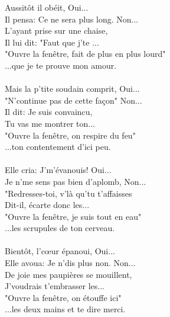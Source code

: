 \breakpage
Aussitôt il obéit, Oui...
\\Il pensa: Ce ne sera plus long. Non...
\\L'ayant prise sur une chaise,
\\Il lui dit: "Faut que j'te ...
\\"Ouvre la fenêtre, fait de plus en plus lourd"
\\...que je te prouve mon amour.
\\\\Mais la p'tite soudain comprit, Oui...
\\"N'continue pas de cette façon" Non...
\\Il dit: Je suis convaincu,
\\Tu vas me montrer ton...
\\"Ouvre la fenêtre, on respire du feu"
\\...ton contentement d'ici peu.
\\\\Elle cria: J'm'évanouis! Oui...
\\Je n'me sens pas bien d'aplomb, Non...
\\"Redresses-toi, v'là qu'tu t'affaisses
\\Dit-il, écarte donc les...
\\"Ouvre la fenêtre, je suis tout en eau"
\\...les scrupules de ton cerveau.
\\\\Bientôt, l'cœur épanoui, Oui...
\\Elle avoua: Je n'dis plus non. Non...
\\De joie mes paupières se mouillent,
\\J'voudrais t'embrasser les...
\\"Ouvre la fenêtre, on étouffe ici"
\\...les deux mains et te dire merci.

\breakpage